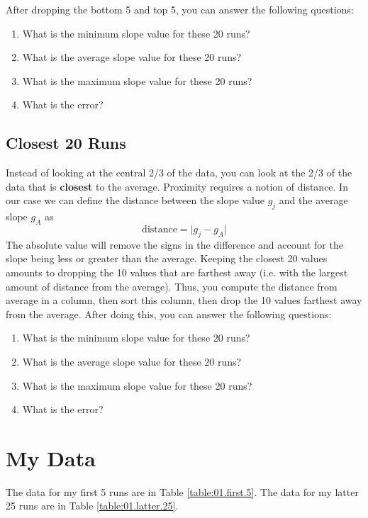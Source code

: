 After dropping the bottom 5 and top 5, you can answer the following questions:
\begin{enumerate}
    \item What is the minimum slope value for these 20 runs?
    \item What is the average slope value for these 20 runs?
    \item What is the maximum slope value for these 20 runs?
    \item What is the error?
\end{enumerate} 
\subsection{Closest 20 Runs} \label{sec:01.closest.20}
Instead of looking at the central 2/3 of the data, you can look at the 2/3 of the data that is \textbf{closest} to the average. Proximity requires a notion of distance. In our case we can define the distance between the slope value $g_{j}$ and the average slope $g_{A}$ as
\begin{equation}
    \text{distance} = \vert g_{j} - g_{A} \vert
\end{equation}
The absolute value will remove the signs in the difference and account for the slope being less or greater than the average. Keeping the closest 20 values amounts to dropping the 10 values that are farthest away (i.e. with the largest amount of distance from the average). Thus, you compute the distance from average in a column, then sort this column, then drop the 10 values farthest away from the average. After doing this, you can answer the following questions:
\begin{enumerate}
    \item What is the minimum slope value for these 20 runs?
    \item What is the average slope value for these 20 runs?
    \item What is the maximum slope value for these 20 runs?
    \item What is the error?
\end{enumerate}
\section{My Data}
The data for my first 5 runs are in Table \ref{table:01.first.5}. The data for my latter 25 runs are in Table \ref{table:01.latter.25}.
